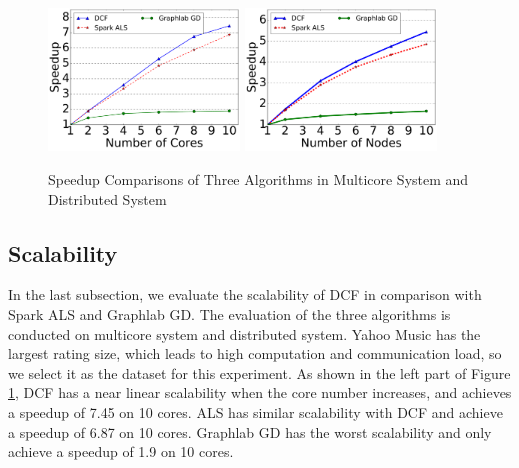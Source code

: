 \documentclass{llncs}
\begin{document}
\begin{figure}[!t]
\centering
\includegraphics[width=2in]{pics/core.pdf}
\includegraphics[width=2in]{pics/node.pdf}
\vspace{-10pt}
\caption{Speedup Comparisons of Three Algorithms in Multicore System and Distributed System}
\vspace{-20pt}
\label{fig:core}
\end{figure}


\vspace{-15pt}
\subsection{Scalability}
\vspace{-5pt}
\label{sub:sca}

In the last subsection, we evaluate the scalability of DCF in comparison with Spark ALS and Graphlab GD. The evaluation of the three algorithms is conducted on multicore system and distributed system. Yahoo Music has the largest rating size, which leads to high computation and communication load, so we select it as the dataset for this experiment. As shown in the left part of Figure \ref{fig:core}, DCF has a near linear scalability when the core number increases, and achieves a speedup of 7.45 on 10 cores. ALS has similar scalability with DCF and achieve a speedup of 6.87 on 10 cores. Graphlab GD has the worst scalability and only achieve a speedup of 1.9 on 10 cores.
\end{document}
